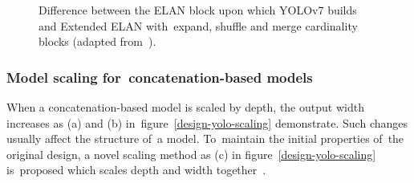\vspace{-12pt}
\begin{figure}[!hbt]
    \centering
    \vspace{-7pt}
    \caption{Difference between the ELAN block upon which YOLOv7 builds and Extended ELAN with~expand, shuffle and merge cardinality blocks (adapted from~\cite{yolov7}).}
    \label{design-yolo-eelan}
\end{figure}

\subsubsection{Model scaling for~concatenation-based models}
When a concatenation-based model is scaled by depth, the output width increases as (a) and (b) in~figure~\ref{design-yolo-scaling} demonstrate. Such changes usually affect the structure of~a model. To~maintain the initial properties of~the original design, a novel scaling method as (c) in figure~\ref{design-yolo-scaling} is~proposed which scales depth and width together~\cite{yolov7}.

